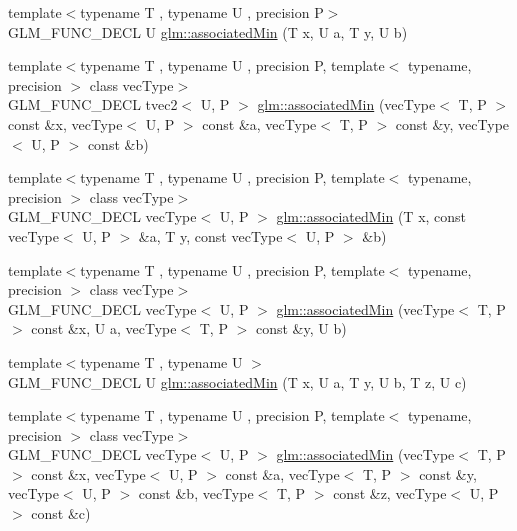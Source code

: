 \begin{DoxyCompactItemize}
\item 
{\footnotesize template$<$typename T , typename U , precision P$>$ }\\G\-L\-M\-\_\-\-F\-U\-N\-C\-\_\-\-D\-E\-C\-L U \hyperlink{group__gtx__associated__min__max_gacc01bd272359572fc28437ae214a02df}{glm\-::associated\-Min} (T x, U a, T y, U b)
\item 
{\footnotesize template$<$typename T , typename U , precision P, template$<$ typename, precision $>$ class vec\-Type$>$ }\\G\-L\-M\-\_\-\-F\-U\-N\-C\-\_\-\-D\-E\-C\-L tvec2$<$ U, P $>$ \hyperlink{group__gtx__associated__min__max_ga8b538d10872626668a078e2bd495af25}{glm\-::associated\-Min} (vec\-Type$<$ T, P $>$ const \&x, vec\-Type$<$ U, P $>$ const \&a, vec\-Type$<$ T, P $>$ const \&y, vec\-Type$<$ U, P $>$ const \&b)
\item 
{\footnotesize template$<$typename T , typename U , precision P, template$<$ typename, precision $>$ class vec\-Type$>$ }\\G\-L\-M\-\_\-\-F\-U\-N\-C\-\_\-\-D\-E\-C\-L vec\-Type$<$ U, P $>$ \hyperlink{group__gtx__associated__min__max_ga1dccff48fa5650c746533de83467da6e}{glm\-::associated\-Min} (T x, const vec\-Type$<$ U, P $>$ \&a, T y, const vec\-Type$<$ U, P $>$ \&b)
\item 
{\footnotesize template$<$typename T , typename U , precision P, template$<$ typename, precision $>$ class vec\-Type$>$ }\\G\-L\-M\-\_\-\-F\-U\-N\-C\-\_\-\-D\-E\-C\-L vec\-Type$<$ U, P $>$ \hyperlink{group__gtx__associated__min__max_ga076717f4e07c6ae725cc1382d1ac4869}{glm\-::associated\-Min} (vec\-Type$<$ T, P $>$ const \&x, U a, vec\-Type$<$ T, P $>$ const \&y, U b)
\item 
{\footnotesize template$<$typename T , typename U $>$ }\\G\-L\-M\-\_\-\-F\-U\-N\-C\-\_\-\-D\-E\-C\-L U \hyperlink{group__gtx__associated__min__max_gad0aa8f86259a26d839d34a3577a923fc}{glm\-::associated\-Min} (T x, U a, T y, U b, T z, U c)
\item 
{\footnotesize template$<$typename T , typename U , precision P, template$<$ typename, precision $>$ class vec\-Type$>$ }\\G\-L\-M\-\_\-\-F\-U\-N\-C\-\_\-\-D\-E\-C\-L vec\-Type$<$ U, P $>$ \hyperlink{group__gtx__associated__min__max_ga5bc6b9acbf9e060d58a342fbe3b73d43}{glm\-::associated\-Min} (vec\-Type$<$ T, P $>$ const \&x, vec\-Type$<$ U, P $>$ const \&a, vec\-Type$<$ T, P $>$ const \&y, vec\-Type$<$ U, P $>$ const \&b, vec\-Type$<$ T, P $>$ const \&z, vec\-Type$<$ U, P $>$ const \&c)

\end{DoxyCompactItemize}

